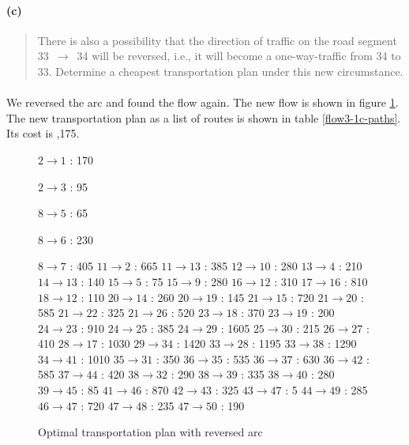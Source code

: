 \paragraph{(c)}
\begin{quote}
There is also a possibility that the direction of traffic on the road segment 33~$\rightarrow$~34 will be reversed, i.e., it will become a one-way-traffic from 34 to 33. Determine a cheapest transportation plan under this new circumstance.
\end{quote}

\paragraph{}
We reversed the arc and found the flow again. The new flow is shown in figure \ref{flow3-1c}. The new transportation plan as a list of routes is shown in table \ref{flow3-1c-paths}. Its cost is ,175.

\begin{figure}[H]
\centering
\begin{multicols}{5}
$ 2 \rightarrow 1 $ : 170

$ 2 \rightarrow 3 $ : 95

$ 8 \rightarrow 5 $ : 65

$ 8 \rightarrow 6 $ : 230

$ 8 \rightarrow 7 $ : 405
$ 11 \rightarrow 2 $ : 665
$ 11 \rightarrow 13 $ : 385
$ 12 \rightarrow 10 $ : 280
$ 13 \rightarrow 4 $ : 210
$ 14 \rightarrow 13 $ : 140
$ 15 \rightarrow 5 $ : 75
$ 15 \rightarrow 9 $ : 280
$ 16 \rightarrow 12 $ : 310
$ 17 \rightarrow 16 $ : 810
$ 18 \rightarrow 12 $ : 110
$ 20 \rightarrow 14 $ : 260
$ 20 \rightarrow 19 $ : 145
$ 21 \rightarrow 15 $ : 720
$ 21 \rightarrow 20 $ : 585
$ 21 \rightarrow 22 $ : 325
$ 21 \rightarrow 26 $ : 520
$ 23 \rightarrow 18 $ : 370
$ 23 \rightarrow 19 $ : 200
$ 24 \rightarrow 23 $ : 910
$ 24 \rightarrow 25 $ : 385
$ 24 \rightarrow 29 $ : 1605
$ 25 \rightarrow 30 $ : 215
$ 26 \rightarrow 27 $ : 410
$ 28 \rightarrow 17 $ : 1030
$ 29 \rightarrow 34 $ : 1420
$ 33 \rightarrow 28 $ : 1195
$ 33 \rightarrow 38 $ : 1290
$ 34 \rightarrow 41 $ : 1010
$ 35 \rightarrow 31 $ : 350
$ 36 \rightarrow 35 $ : 535
$ 36 \rightarrow 37 $ : 630
$ 36 \rightarrow 42 $ : 585
$ 37 \rightarrow 44 $ : 420
$ 38 \rightarrow 32 $ : 290
$ 38 \rightarrow 39 $ : 335
$ 38 \rightarrow 40 $ : 280
$ 39 \rightarrow 45 $ : 85
$ 41 \rightarrow 46 $ : 870
$ 42 \rightarrow 43 $ : 325
$ 43 \rightarrow 47 $ : 5
$ 44 \rightarrow 49 $ : 285
$ 46 \rightarrow 47 $ : 720
$ 47 \rightarrow 48 $ : 235
$ 47 \rightarrow 50 $ : 190
\end{multicols}
\caption{Optimal transportation plan with reversed arc}
\label{flow3-1c}
\end{figure}

